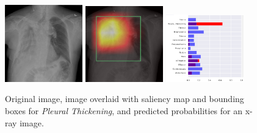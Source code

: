 \documentclass[12pt,oneside,a4paper]{report}
\begin{document}
\begin{figure}[H]
  \centering
  \includegraphics[width=0.3\textwidth]{images/preds/PT}\hspace{0.01\textwidth}%
  \includegraphics[width=0.3\textwidth]{images/preds/PT_cam}\hspace{0.01\textwidth}%
  \includegraphics[width=0.3\textwidth]{images/preds/PT_probs}\\[0.01\textwidth]
  \caption{Original image, image overlaid with saliency map and bounding boxes
    for \emph{Pleural Thickening}, and predicted probabilities for an x-ray
    image.}
  \label{examples_13}
\end{figure}
\end{document}
